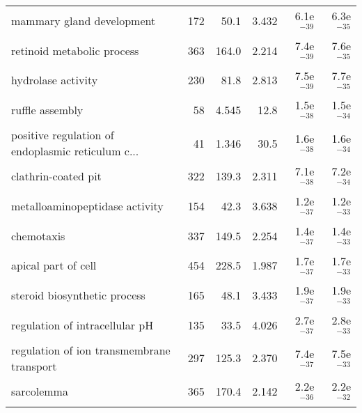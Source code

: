 \begin{longtable}{lrrrrr}
                         mammary gland development &                     172 &                    50.1 &      3.432 &         6.1e$^{-39}$ &         6.3e$^{-35}$ \\
                        retinoid metabolic process &                     363 &                   164.0 &      2.214 &         7.4e$^{-39}$ &         7.6e$^{-35}$ \\
                                hydrolase activity &                     230 &                    81.8 &      2.813 &         7.5e$^{-39}$ &         7.7e$^{-35}$ \\
                                   ruffle assembly &                      58 &                   4.545 &       12.8 &         1.5e$^{-38}$ &         1.5e$^{-34}$ \\
 positive regulation of endoplasmic reticulum c... &                      41 &                   1.346 &       30.5 &         1.6e$^{-38}$ &         1.6e$^{-34}$ \\
                               clathrin-coated pit &                     322 &                   139.3 &      2.311 &         7.1e$^{-38}$ &         7.2e$^{-34}$ \\
                    metalloaminopeptidase activity &                     154 &                    42.3 &      3.638 &         1.2e$^{-37}$ &         1.2e$^{-33}$ \\
                                        chemotaxis &                     337 &                   149.5 &      2.254 &         1.4e$^{-37}$ &         1.4e$^{-33}$ \\
                               apical part of cell &                     454 &                   228.5 &      1.987 &         1.7e$^{-37}$ &         1.7e$^{-33}$ \\
                      steroid biosynthetic process &                     165 &                    48.1 &      3.433 &         1.9e$^{-37}$ &         1.9e$^{-33}$ \\
                    regulation of intracellular pH &                     135 &                    33.5 &      4.026 &         2.7e$^{-37}$ &         2.8e$^{-33}$ \\
         regulation of ion transmembrane transport &                     297 &                   125.3 &      2.370 &         7.4e$^{-37}$ &         7.5e$^{-33}$ \\
                                        sarcolemma &                     365 &                   170.4 &      2.142 &         2.2e$^{-36}$ &         2.2e$^{-32}$ \\

\end{longtable}
